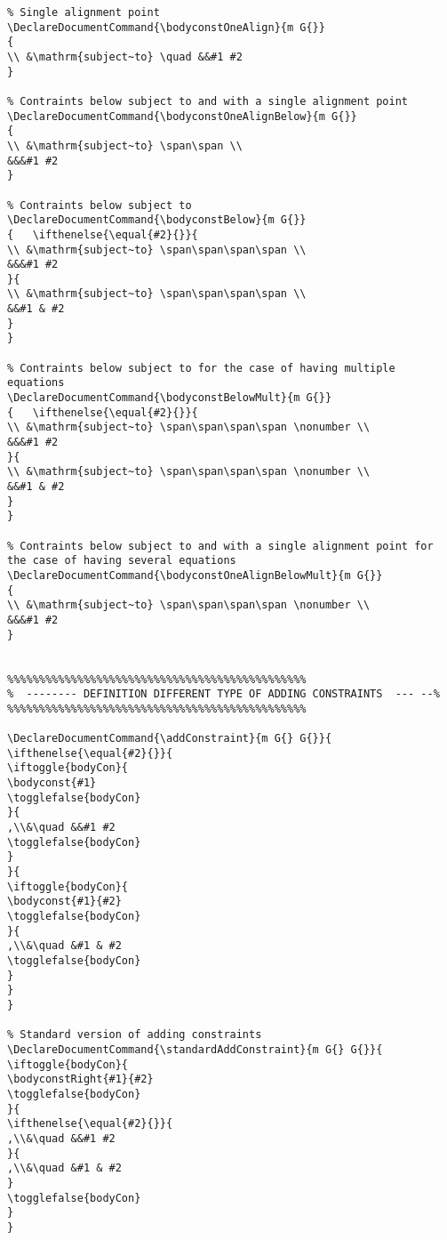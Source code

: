\documentclass[]{report}
\begin{document}
\begin{verbatim}
% Single alignment point
\DeclareDocumentCommand{\bodyconstOneAlign}{m G{}}
{
\\ &\mathrm{subject~to} \quad &&#1 #2
}

% Contraints below subject to and with a single alignment point
\DeclareDocumentCommand{\bodyconstOneAlignBelow}{m G{}}
{
\\ &\mathrm{subject~to} \span\span \\
&&&#1 #2		
}

% Contraints below subject to
\DeclareDocumentCommand{\bodyconstBelow}{m G{}}
{	\ifthenelse{\equal{#2}{}}{
\\ &\mathrm{subject~to} \span\span\span\span \\
&&&#1 #2		
}{
\\ &\mathrm{subject~to} \span\span\span\span \\
&&#1 & #2
}
}

% Contraints below subject to for the case of having multiple equations
\DeclareDocumentCommand{\bodyconstBelowMult}{m G{}}
{	\ifthenelse{\equal{#2}{}}{
\\ &\mathrm{subject~to} \span\span\span\span \nonumber \\
&&&#1 #2		
}{
\\ &\mathrm{subject~to} \span\span\span\span \nonumber \\
&&#1 & #2
}
}

% Contraints below subject to and with a single alignment point for the case of having several equations
\DeclareDocumentCommand{\bodyconstOneAlignBelowMult}{m G{}}
{
\\ &\mathrm{subject~to} \span\span\span\span \nonumber \\
&&&#1 #2		
}


%%%%%%%%%%%%%%%%%%%%%%%%%%%%%%%%%%%%%%%%%%%%%%%
%  -------- DEFINITION DIFFERENT TYPE OF ADDING CONSTRAINTS  --- --%
%%%%%%%%%%%%%%%%%%%%%%%%%%%%%%%%%%%%%%%%%%%%%%%

\DeclareDocumentCommand{\addConstraint}{m G{} G{}}{
\ifthenelse{\equal{#2}{}}{
\iftoggle{bodyCon}{
\bodyconst{#1}
\togglefalse{bodyCon}
}{
,\\&\quad &&#1 #2
\togglefalse{bodyCon}
}
}{
\iftoggle{bodyCon}{
\bodyconst{#1}{#2}
\togglefalse{bodyCon}
}{
,\\&\quad &#1 & #2
\togglefalse{bodyCon}
}
}
}

% Standard version of adding constraints
\DeclareDocumentCommand{\standardAddConstraint}{m G{} G{}}{
\iftoggle{bodyCon}{
\bodyconstRight{#1}{#2}
\togglefalse{bodyCon}
}{
\ifthenelse{\equal{#2}{}}{
,\\&\quad &&#1 #2
}{
,\\&\quad &#1 & #2
}
\togglefalse{bodyCon}
}
}


\end{verbatim}
\end{document}
